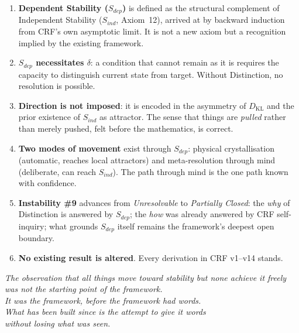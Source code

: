 \documentclass[12pt, a4paper]{article}
\begin{document}
\begin{enumerate}
\item \textbf{Dependent Stability ($S_{dep}$)} is defined as the structural complement of
Independent Stability ($S_{ind}$, Axiom~12), arrived at by backward induction from
CRF's own asymptotic limit. It is not a new axiom but a recognition implied by the
existing framework.

\item \textbf{$S_{dep}$ necessitates $\delta$}: a condition that cannot remain as it
is requires the capacity to distinguish current state from target. Without Distinction,
no resolution is possible.

\item \textbf{Direction is not imposed}: it is encoded in the asymmetry of
$D_{\mathrm{KL}}$ and the prior existence of $S_{ind}$ as attractor. The sense that
things are \textit{pulled} rather than merely pushed, felt before the mathematics,
is correct.

\item \textbf{Two modes of movement} exist through $S_{dep}$: physical crystallisation
(automatic, reaches local attractors) and meta-resolution through mind (deliberate,
can reach $S_{ind}$). The path through mind is the one path known with confidence.

\item \textbf{Instability \#9} advances from \textit{Unresolvable} to
\textit{Partially Closed}: the \textit{why} of Distinction is answered by $S_{dep}$;
the \textit{how} was already answered by CRF self-inquiry; what grounds $S_{dep}$
itself remains the framework's deepest open boundary.

\item \textbf{No existing result is altered}. Every derivation in CRF v1--v14 stands.
\end{enumerate}

\bigskip
\begin{center}
\textit{The observation that all things move toward stability but none achieve it freely\\
was not the starting point of the framework.\\
It was the framework, before the framework had words.\\
What has been built since is the attempt to give it words\\
without losing what was seen.}
\end{center}

\end{document}
